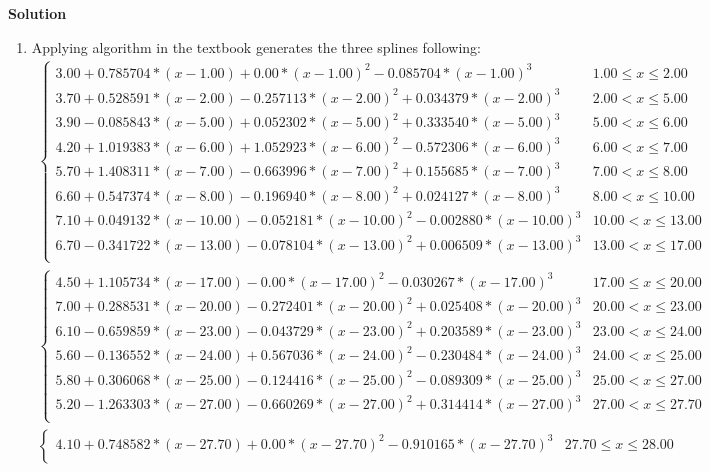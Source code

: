 \documentclass[8pt]{article} %
\newenvironment{solution}%
{\par\textbf{Solution}\space }%
{\par}
\begin{document}
\begin{solution}
	\begin{enumerate}[label=(\alph*)]
		\item{Applying algorithm in the textbook generates the three splines following:\\
			\begin{gather*}
				\begin{cases}
					3.00+0.785704*(x-1.00)+0.00*(x-1.00)^2-0.085704*(x-1.00)^3 &  1.00\leq x\leq 2.00\\
					3.70+0.528591*(x-2.00)-0.257113*(x-2.00)^2+0.034379*(x-2.00)^3 & 2.00<x\leq 5.00\\
					3.90-0.085843*(x-5.00)+0.052302*(x-5.00)^2+0.333540*(x-5.00)^3 & 5.00<x\leq 6.00\\
					4.20+1.019383*(x-6.00)+1.052923*(x-6.00)^2-0.572306*(x-6.00)^3 & 6.00<x\leq 7.00\\
					5.70+1.408311*(x-7.00)-0.663996*(x-7.00)^2+0.155685*(x-7.00)^3 & 7.00<x\leq 8.00\\
					6.60+0.547374*(x-8.00)-0.196940*(x-8.00)^2+0.024127*(x-8.00)^3 & 8.00<x\leq 10.00\\
					7.10+0.049132*(x-10.00)-0.052181*(x-10.00)^2-0.002880*(x-10.00)^3 & 10.00<x\leq 13.00\\
					6.70-0.341722*(x-13.00)-0.078104*(x-13.00)^2+0.006509*(x-13.00)^3 & 13.00<x\leq 17.00\\
				\end{cases}\\
				\begin{cases}
					4.50+1.105734*(x-17.00)-0.00*(x-17.00)^2-0.030267*(x-17.00)^3&  17.00\leq x\leq 20.00\\
					7.00+0.288531*(x-20.00)-0.272401*(x-20.00)^2+0.025408*(x-20.00)^3&  20.00<x\leq 23.00\\
					6.10-0.659859*(x-23.00)-0.043729*(x-23.00)^2+0.203589*(x-23.00)^3&  23.00<x\leq 24.00\\
					5.60-0.136552*(x-24.00)+0.567036*(x-24.00)^2-0.230484*(x-24.00)^3&  24.00<x\leq 25.00\\
					5.80+0.306068*(x-25.00)-0.124416*(x-25.00)^2-0.089309*(x-25.00)^3&  25.00<x\leq 27.00\\
					5.20-1.263303*(x-27.00)-0.660269*(x-27.00)^2+0.314414*(x-27.00)^3&  27.00<x\leq 27.70\\
				\end{cases}\\
				\begin{cases}
					4.10+0.748582*(x-27.70)+0.00*(x-27.70)^2-0.910165*(x-27.70)^3&  27.70\leq x\leq 28.00\\

\end{cases}
\end{gather*}}
\end{enumerate}
\end{solution}
\end{document}
